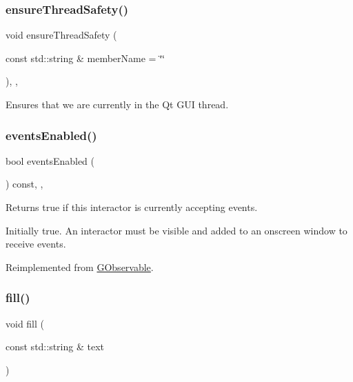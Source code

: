 \subsubsection{\texorpdfstring{ensure\+Thread\+Safety()}{ensureThreadSafety()}}
{\footnotesize\ttfamily void ensure\+Thread\+Safety (\begin{DoxyParamCaption}\item[{const std\+::string \&}]{member\+Name = {\ttfamily \char`\"{}\char`\"{}} }\end{DoxyParamCaption})\hspace{0.3cm}{\ttfamily [protected]}, {\ttfamily [virtual]}, {\ttfamily [inherited]}}



Ensures that we are currently in the Qt G\+UI thread. 

\mbox{\label{classGInteractor_a597a370b592e3737d38d9d2f4e2031ea}} 
\subsubsection{\texorpdfstring{events\+Enabled()}{eventsEnabled()}}
{\footnotesize\ttfamily bool events\+Enabled (\begin{DoxyParamCaption}{ }\end{DoxyParamCaption}) const\hspace{0.3cm}{\ttfamily [override]}, {\ttfamily [virtual]}, {\ttfamily [inherited]}}



Returns true if this interactor is currently accepting events. 

Initially true. An interactor must be visible and added to an onscreen window to receive events. 

Reimplemented from \mbox{\hyperlink{classGObservable_a8ebb3da91032e7f4c34485dabc518b8a}{G\+Observable}}.

\mbox{\label{classGTable_a1ff40d0915f96652929cfb739bdd969f}} 
\subsubsection{\texorpdfstring{fill()}{fill()}}
{\footnotesize\ttfamily void fill (\begin{DoxyParamCaption}\item[{const std\+::string \&}]{text }\end{DoxyParamCaption})\hspace{0.3cm}{\ttfamily [virtual]}}



